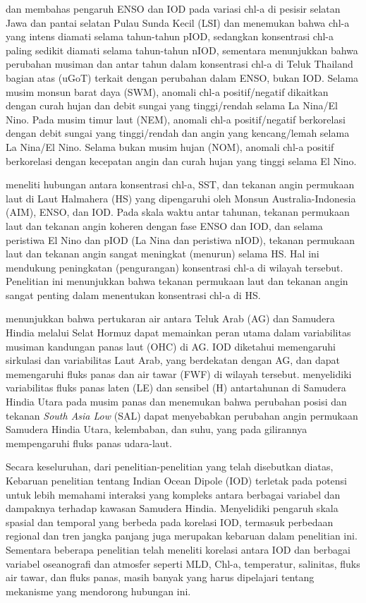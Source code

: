 \begin{spacing}{1.5}
	 dan  membahas pengaruh ENSO dan IOD pada variasi chl-a di pesisir selatan Jawa dan pantai selatan Pulau Sunda Kecil (LSI) dan menemukan bahwa chl-a yang intens diamati selama tahun-tahun pIOD, sedangkan konsentrasi chl-a paling sedikit diamati selama tahun-tahun nIOD, sementara  menunjukkan bahwa perubahan musiman dan antar tahun dalam konsentrasi chl-a di Teluk Thailand bagian atas (uGoT) terkait dengan perubahan dalam ENSO, bukan IOD. Selama musim monsun barat daya (SWM), anomali chl-a positif/negatif dikaitkan dengan curah hujan dan debit sungai yang tinggi/rendah selama La Nina/El Nino. Pada musim timur laut (NEM), anomali chl-a positif/negatif berkorelasi dengan debit sungai yang tinggi/rendah dan angin yang kencang/lemah selama La Nina/El Nino. Selama bukan musim hujan (NOM), anomali chl-a positif berkorelasi dengan kecepatan angin dan curah hujan yang tinggi selama El Nino. 
	
	 meneliti hubungan antara konsentrasi chl-a, SST, dan tekanan angin permukaan laut di Laut Halmahera (HS) yang dipengaruhi oleh Monsun Australia-Indonesia (AIM), ENSO, dan IOD. Pada skala waktu antar tahunan, tekanan permukaan laut dan tekanan angin koheren dengan fase ENSO dan IOD, dan selama peristiwa El Nino dan pIOD (La Nina dan peristiwa nIOD), tekanan permukaan laut dan tekanan angin sangat meningkat (menurun) selama HS. Hal ini mendukung peningkatan (pengurangan) konsentrasi chl-a di wilayah tersebut. Penelitian ini menunjukkan bahwa tekanan permukaan laut dan tekanan angin sangat penting dalam menentukan konsentrasi chl-a di HS.
	
	 menunjukkan bahwa pertukaran air antara Teluk Arab (AG) dan Samudera Hindia melalui Selat Hormuz dapat memainkan peran utama dalam variabilitas musiman kandungan panas laut (OHC) di AG. IOD diketahui memengaruhi sirkulasi dan variabilitas Laut Arab, yang berdekatan dengan AG, dan dapat memengaruhi fluks panas dan air tawar (FWF) di wilayah tersebut.   menyelidiki variabilitas fluks panas laten (LE) dan sensibel (H) antartahunan di Samudera Hindia Utara pada musim panas dan menemukan bahwa perubahan posisi dan tekanan \textit{South Asia Low} (SAL) dapat menyebabkan perubahan angin permukaan Samudera Hindia Utara, kelembaban, dan suhu, yang pada gilirannya mempengaruhi fluks panas udara-laut.
	
	Secara keseluruhan, dari penelitian-penelitian yang telah disebutkan diatas, Kebaruan penelitian tentang Indian Ocean Dipole (IOD) terletak pada potensi untuk lebih memahami interaksi yang kompleks antara berbagai variabel dan dampaknya terhadap kawasan Samudera Hindia. Menyelidiki pengaruh skala spasial dan temporal yang berbeda pada korelasi IOD, termasuk perbedaan regional dan tren jangka panjang juga merupakan kebaruan dalam penelitian ini. Sementara beberapa penelitian telah meneliti korelasi antara IOD dan berbagai variabel oseanografi dan atmosfer seperti MLD, Chl-a, temperatur, salinitas, fluks air tawar, dan fluks panas, masih banyak yang harus dipelajari tentang mekanisme yang mendorong hubungan ini.
	
\end{spacing}
\vspace{-1pc}
